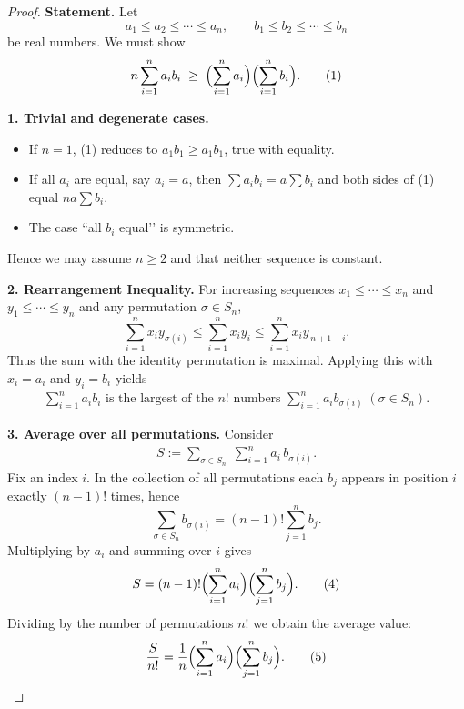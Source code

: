 \begin{proof}
\textbf{Statement.}  
Let  
\[
a_{1}\le a_{2}\le\cdots\le a_{n},\qquad 
b_{1}\le b_{2}\le\cdots\le b_{n}
\]
be real numbers.  We must show
\begin{align}
n\sum_{i=1}^{n}a_{i}b_{i}\;\ge\;
\Bigl(\sum_{i=1}^{n}a_{i}\Bigr)\Bigl(\sum_{i=1}^{n}b_{i}\Bigr).\tag{1}
\end{align}

\medskip\noindent\textbf{1. Trivial and degenerate cases.}
\begin{itemize}
\item If \(n=1\), (1) reduces to \(a_{1}b_{1}\ge a_{1}b_{1}\), true with equality.
\item If all \(a_{i}\) are equal, say \(a_{i}=a\), then  
\(\sum a_{i}b_{i}=a\sum b_{i}\) and both sides of (1) equal \(na\sum b_{i}\).
\item The case “all \(b_{i}\) equal’’ is symmetric.
\end{itemize}
Hence we may assume \(n\ge2\) and that neither sequence is constant.

\medskip\noindent\textbf{2. Rearrangement Inequality.}  
For increasing sequences \(x_{1}\le\cdots\le x_{n}\) and
\(y_{1}\le\cdots\le y_{n}\) and any permutation \(\sigma\in S_{n}\),
\[
\sum_{i=1}^{n}x_{i}y_{\sigma(i)}\le
\sum_{i=1}^{n}x_{i}y_{i}\le
\sum_{i=1}^{n}x_{i}y_{\,n+1-i}.
\]
Thus the sum with the identity permutation is maximal.  
Applying this with \(x_{i}=a_{i}\) and \(y_{i}=b_{i}\) yields
\begin{align}
\sum_{i=1}^{n}a_{i}b_{i}
\text{ is the largest of the } n!
\text{ numbers }
\sum_{i=1}^{n}a_{i}b_{\sigma(i)}\;( \sigma\in S_{n}).\tag{2}
\end{align}

\medskip\noindent\textbf{3. Average over all permutations.}  
Consider
\begin{align}
S:=\sum_{\sigma\in S_{n}}\;\sum_{i=1}^{n}a_{i}\,b_{\sigma(i)}.\tag{3}
\end{align}
Fix an index \(i\).  In the collection of all permutations each \(b_{j}\) appears
in position \(i\) exactly \((n-1)!\) times, hence
\[
\sum_{\sigma\in S_{n}}b_{\sigma(i)}=(n-1)!\sum_{j=1}^{n}b_{j}.
\]
Multiplying by \(a_{i}\) and summing over \(i\) gives
\begin{align}
S=(n-1)!\Bigl(\sum_{i=1}^{n}a_{i}\Bigr)\Bigl(\sum_{j=1}^{n}b_{j}\Bigr).\tag{4}
\end{align}
Dividing by the number of permutations \(n!\) we obtain the average value:
\begin{align}
\frac{S}{n!}= \frac{1}{n}\Bigl(\sum_{i=1}^{n}a_{i}\Bigr)\Bigl(\sum_{j=1}^{n}b_{j}\Bigr).\tag{5}
\end{align}


\end{proof}
